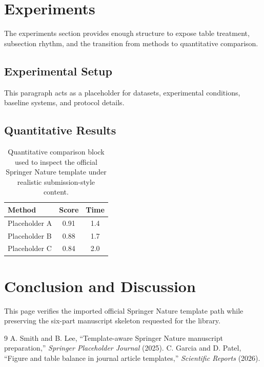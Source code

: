 \documentclass[pdflatex,sn-mathphys-num]{sn-jnl}
\begin{document}
\section{Experiments}
The experiments section provides enough structure to expose table treatment, subsection rhythm, and the transition from methods to quantitative comparison.
\subsection{Experimental Setup}
This paragraph acts as a placeholder for datasets, experimental conditions, baseline systems, and protocol details.
\subsection{Quantitative Results}
\begin{table}[t]
\caption{Quantitative comparison block used to inspect the official Springer Nature template under realistic submission-style content.}
\centering
\begin{tabular}{lcc}
\toprule
Method & Score & Time \\
\midrule
Placeholder A & 0.91 & 1.4 \\
Placeholder B & 0.88 & 1.7 \\
Placeholder C & 0.84 & 2.0 \\
\bottomrule
\end{tabular}
\end{table}
\section{Conclusion and Discussion}
This page verifies the imported official Springer Nature template path while preserving the six-part manuscript skeleton requested for the library.
\begin{thebibliography}{9}
 A. Smith and B. Lee, ``Template-aware Springer Nature manuscript preparation,'' \textit{Springer Placeholder Journal} (2025).
 C. Garcia and D. Patel, ``Figure and table balance in journal article templates,'' \textit{Scientific Reports} (2026).
\end{thebibliography}
\end{document}
